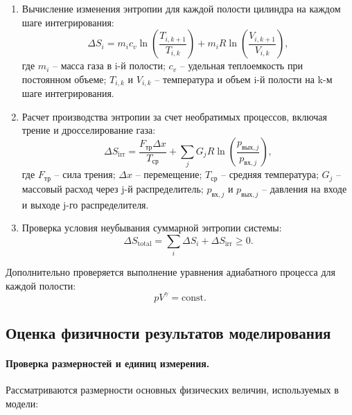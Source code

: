 \begin{enumerate}
    \item Вычисление изменения энтропии для каждой полости цилиндра на каждом шаге интегрирования:
          \begin{equation}
              \Delta S_i = m_i c_v \ln\left(\frac{T_{i,k+1}}{T_{i,k}}\right) + m_i R \ln\left(\frac{V_{i,k+1}}{V_{i,k}}\right),
          \end{equation}
          где $m_i$ -- масса газа в i-й полости;
          $c_v$ -- удельная теплоемкость при постоянном объеме;
          $T_{i,k}$ и $V_{i,k}$ -- температура и объем i-й полости на k-м шаге интегрирования.

    \item Расчет производства энтропии за счет необратимых процессов, включая трение и дросселирование газа:
          \begin{equation}
              \Delta S_{\text{irr}} = \frac{F_{\text{тр}} \Delta x}{T_{\text{ср}}} + \sum_j G_j R \ln\left(\frac{p_{\text{вых},j}}{p_{\text{вх},j}}\right),
          \end{equation}
          где $F_{\text{тр}}$ -- сила трения;
          $\Delta x$ -- перемещение;
          $T_{\text{ср}}$ -- средняя температура;
          $G_j$ -- массовый расход через j-й распределитель;
          $p_{\text{вх},j}$ и $p_{\text{вых},j}$ -- давления на входе и выходе j-го распределителя.

    \item Проверка условия неубывания суммарной энтропии системы:
          \begin{equation}
              \Delta S_{\text{total}} = \sum_i \Delta S_i + \Delta S_{\text{irr}} \geq 0.
          \end{equation}
\end{enumerate}

Дополнительно проверяется выполнение уравнения адиабатного процесса для каждой полости:
\begin{equation}
    pV^{\gamma} = \text{const}.
\end{equation}

\subsection{Оценка физичности результатов моделирования}\label{sec:ch2/sec6/subsec4}

\paragraph{Проверка размерностей и единиц измерения.}
Рассматриваются размерности основных физических величин, используемых в модели:

